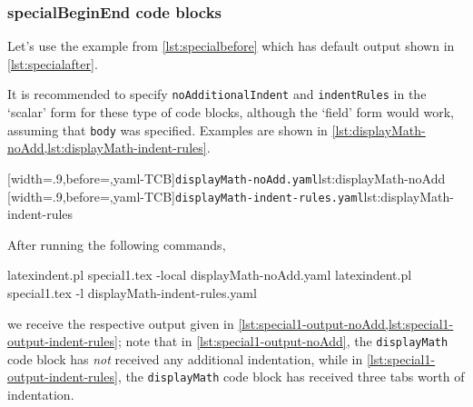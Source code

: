 \subsubsection{specialBeginEnd code blocks}
 Let's use the example from \vref{lst:specialbefore} which has default output shown in
 \vref{lst:specialafter}.

 \begin{example}
 It is recommended to specify \texttt{noAdditionalIndent} and \texttt{indentRules} in the
 `scalar' form for these type of code blocks, although the `field' form would work,
 assuming that \texttt{body} was specified. Examples are shown in
 \cref{lst:displayMath-noAdd,lst:displayMath-indent-rules}.
  

 \begin{cmhtcbraster}
  [width=.9\linewidth,before=\centering,yaml-TCB]{\texttt{displayMath-noAdd.yaml}}{lst:displayMath-noAdd}
  [width=.9\linewidth,before=\centering,yaml-TCB]{\texttt{displayMath-indent-rules.yaml}}{lst:displayMath-indent-rules}
 \end{cmhtcbraster}

 After running the following commands, 
 \begin{commandshell}
latexindent.pl special1.tex -local displayMath-noAdd.yaml  
latexindent.pl special1.tex -l displayMath-indent-rules.yaml  
\end{commandshell}
 we receive the respective output given in
 \cref{lst:special1-output-noAdd,lst:special1-output-indent-rules}; note that in
 \cref{lst:special1-output-noAdd}, the \texttt{displayMath} code block has \emph{not}
 received any additional indentation, while in \cref{lst:special1-output-indent-rules},
 the \texttt{displayMath} code block has received three tabs worth of indentation.

 \begin{cmhtcbraster}
 \end{cmhtcbraster}
 \end{example}

